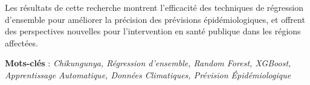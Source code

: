 Les résultats de cette recherche montrent l'efficacité des techniques de régression d'ensemble pour améliorer la précision des prévisions épidémiologiques, et offrent des perspectives nouvelles pour l'intervention en santé publique dans les régions affectées.

\textbf{Mots-clés} : \textit{Chikungunya, Régression d'ensemble, Random Forest, XGBoost, Apprentissage Automatique, Données Climatiques, Prévision Épidémiologique}

